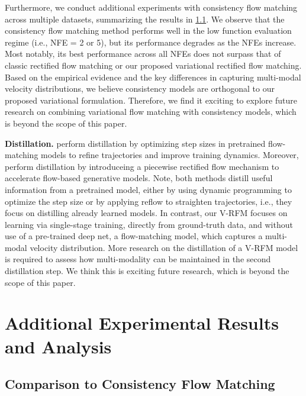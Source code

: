 Furthermore, we conduct additional experiments with consistency flow matching across multiple datasets, summarizing the results in \cref{app:consistency_model}. We observe that the consistency flow matching method performs well in the low function evaluation regime (i.e., NFE = 2 or 5), but its performance degrades as the NFEs increase. Most notably, its best performance across all NFEs does not surpass that of classic rectified flow matching or our proposed variational rectified flow matching. Based on the empirical evidence and the key differences in capturing multi-modal velocity distributions, we believe consistency models are orthogonal to our proposed variational formulation. Therefore, we find it exciting to explore future research on combining variational flow matching with consistency models, which is beyond the scope of this paper.



\noindent\textbf{Distillation.} \citet{nguyenbellman} perform distillation by optimizing step sizes in pretrained flow-matching models to refine trajectories and improve training dynamics. Moreover, \citet{yan2024perflow} perform distillation by introduceing a piecewise rectified flow mechanism to accelerate flow-based generative models. Note, both methods distill useful information from a pretrained model, either by using dynamic programming to optimize the step size or by applying reflow to straighten trajectories, i.e., they focus on distilling already learned models. In contrast, our V-RFM focuses on learning via single-stage training, directly from ground-truth data, and without use of a pre-trained deep net, a flow-matching model, which captures a multi-modal velocity distribution. 
More research on the distillation of a V-RFM model is required to assess how multi-modality can be maintained in the second distillation step. We think this is exciting future research, which is beyond the scope of this paper.









\section{Additional Experimental Results and Analysis}
\label{app:addexp}

\subsection{Comparison to Consistency Flow Matching}
\label{app:consistency_model}

